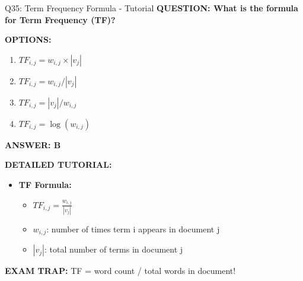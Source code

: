 \documentclass[8pt]{beamer}
\begin{document}
	\begin{frame}{Q35: Term Frequency Formula - Tutorial}
		\fontsize{6.5}{7.5}\selectfont
		\textbf{QUESTION: What is the formula for Term Frequency (TF)?}
		
		\vspace{0.1cm}
		\textbf{OPTIONS:}
		\begin{enumerate}
			\item $TF_{i,j} = w_{i,j} \times |v_j|$
			\item $TF_{i,j} = w_{i,j} / |v_j|$
			\item $TF_{i,j} = |v_j| / w_{i,j}$
			\item $TF_{i,j} = \log(w_{i,j})$
		\end{enumerate}
		
		\vspace{0.1cm}
		\textcolor{myblue}{\textbf{ANSWER: B}}
		
		\vspace{0.1cm}
		\textbf{DETAILED TUTORIAL:}
		\begin{itemize}
			\item \textbf{TF Formula:}
			\begin{itemize}
				\item $TF_{i,j} = \frac{w_{i,j}}{|v_j|}$
				\item $w_{i,j}$: number of times term i appears in document j
				\item $|v_j|$: total number of terms in document j
			\end{itemize}
		\end{itemize}
		
		\textcolor{myred}{\textbf{EXAM TRAP:}} TF = \textcolor{myblue}{word count / total words in document}!
	\end{frame}
	
\end{document}
